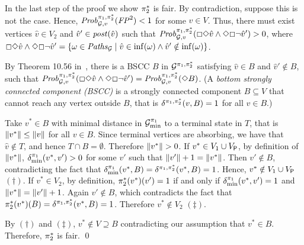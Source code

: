 \begin{myproof}
  In the last step of the proof we show $\pi^*_{2}$ is fair.
  By contradiction, suppose this is not the case.  Hence,
  $\mathit{Prob}^{\pi_{1}, \pi^*_{2}}_{\mathcal{G},v}(\mathit{FP}^2) < 1$ for some
  $v\in V$.  Thus, there must exist vertices $\hat{v}\in V_2$
  and $\hat{v}'\in\mathit{post}(\hat{v})$ such that 
  $\mathit{Prob}^{\pi_{1}, \pi^*_{2}}_{\mathcal{G},v}({\Box\Diamond\hat{v}}\land{\Diamond\Box\neg\hat{v}'})>0$,
  where
  ${\Box\Diamond\hat{v}}\land{\Diamond\Box\neg\hat{v}'} =\{ {\omega\in\mathit{Paths}_{\mathcal{G}}} \mid {\hat{v} \in \inf(\omega)} \land {\hat{v}' \notin \inf(\omega)} \}$.

  By Theorem 10.56 in~\cite{BaierK08}, there is a BSCC
  $B$ in $\mathcal{G}^{\pi_{1},\pi^*_{2}}$ satisfying $\hat{v}\in
  B$ and $\hat{v}'\notin B$, such that
  $\mathit{Prob}^{\pi_{1}, \pi^*_{2}}_{\mathcal{G},v}({\Box\Diamond\hat{v}}\land{\Diamond\Box\neg\hat{v}'})
  = \mathit{Prob}^{\pi_{1}, \pi^*_{2}}_{\mathcal{G},v}({\Diamond B})$.
%
  (A \emph{bottom strongly connected component (BSCC)} is a strongly
  connected component $B\subseteq V$ that cannot reach any vertex
  outside $B$, that is $\delta^{\pi_{1},\pi^*_{2}}(v,B)=1$
  for all $v\in B$.)

  Take $v^*\in B$ with minimal distance in
  $\mathcal{G}^{\pi_{1}}_{\min}$ to a terminal state in $T$, that is
  ${\lVert{v^*}\rVert}\leq{\lVert{v}\rVert}$ for all $v\in B$.  Since terminal
  vertices are absorbing, we have that $\hat{v}\notin T$, and hence
  $T\cap B=\emptyset$.  Therefore ${\lVert{v^*}\rVert}>0$.
  If $v^*\in V_1 \cup V_{\mathsf{P}}$, by definition of
  ${\lVert{v^*}\rVert}$, $\delta^{\pi_{1}}_{\min}(v^*,v')>0$
  for some $v'$ such that ${\lVert{v'}\rVert}+1={\lVert{v^*}\rVert}$. Then
  $v'\notin B$, contradicting the fact that
  $\delta^{\pi_{1}}_{\min}(v^*,B)=\delta^{\pi_{1},\pi^*_{2}}(v^*,B)=1$.
  Hence, $v^*\notin V_1 \cup V_{\mathsf{P}}$ $(\dagger)$.
  If $v^*\in V_2$, by definition,
  $\pi^*_{2}(v^*)(v')=1$ if and only if
  $\delta^{\pi_{1}}_{\min}(v^*,v')=1$ and
  ${\lVert{v^*}\rVert}={\lVert{v'}\rVert}+1$. Again $v'\notin B$, 
  which contradicts the fact that
  $\pi^*_{2}(v^*)(B)=\delta^{\pi_{1},\pi^*_{2}}(v^*,B)=1$.
  Therefore $v^*\notin V_2$ $(\ddagger)$.
  
  By $(\dagger)$ and $(\ddagger)$, $v^*\notin V \supseteq B$
  contradicting our assumption that $v^*\in B$.  Therefore,
  $\pi^*_{2}$ is fair.
  \qed
\end{myproof}


